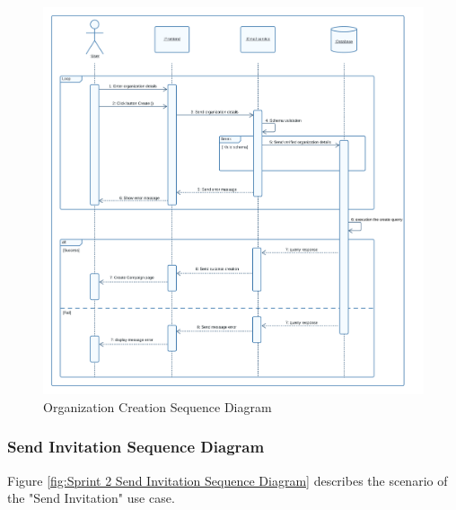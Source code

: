 \begin{figure}[ht]
	\centering
	\includegraphics[width=\linewidth]{Images/sprint2/create org sequence diag.png}
	\caption{Organization Creation Sequence Diagram}
	\label{fig:Sprint 2 Organization Creation Sequence Diagram}
\end{figure}

\clearpage

\subsubsection{Send Invitation Sequence Diagram}

Figure \ref{fig:Sprint 2 Send Invitation Sequence Diagram} describes the scenario of the "Send Invitation" use case.

